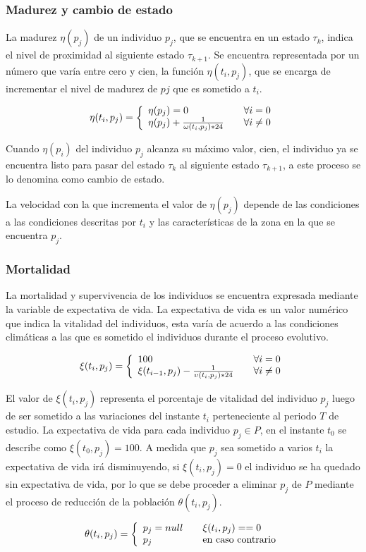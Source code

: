 \subsubsection{Madurez y cambio de estado}
La madurez $\eta (p_{j})$ de un individuo $p_{j}$, que se encuentra en un estado $\tau_{k}$, indica el nivel de
proximidad al siguiente estado $\tau_{k+1}$. Se encuentra representada por un número que varía entre
cero y cien, la función $\eta (t_{i}, p_{j})$, que se encarga de incrementar el nivel de madurez de $p{j}$
que es sometido a $t_{i}$.

\begin{equation}
\eta (t_{i}, p_{j}) = \left\{
  \begin{array}{l l}
    \eta (p_{j}) = 0 & \quad \forall i = 0 \\
    \eta (p_{j}) + \frac{1}{\omega(t_{i}, p_{j}) * 24} & \quad \forall i \neq 0
  \end{array} \right.
\end{equation}

Cuando $\eta(p_{i})$ del individuo $p_{j}$ alcanza su máximo valor, cien, el individuo ya se encuentra listo para
pasar del estado $\tau_{k}$ al siguiente estado $\tau_{k+1}$, a este proceso se lo denomina como cambio de estado.

La velocidad con la que incrementa el valor de $\eta(p_{j})$ depende de las condiciones a las condiciones
descritas  por $t_{i}$ y las características de la zona en la que se encuentra $p_{j}$.

\subsubsection{Mortalidad}
La mortalidad y supervivencia de los individuos se encuentra expresada mediante la variable de expectativa de
vida. La expectativa de vida es un valor numérico que indica la vitalidad del individuos, esta varía de acuerdo
a las condiciones climáticas a las que es sometido el individuos durante el proceso evolutivo.

\begin{equation}
\xi (t_{i}, p_{j}) = \left\{
  \begin{array}{l l}
    100 & \quad \forall i = 0 \\
    \xi (t_{i-1}, p_{j}) - \frac{1}{\upsilon(t_{i}, p_{j}) * 24} & \quad \forall i \neq 0
  \end{array} \right.
\end{equation}

El valor de $\xi (t_{i}, p_{j})$ representa el porcentaje de vitalidad del
individuo $p_{j}$ luego de ser sometido a las variaciones del instante
$t_{i}$ perteneciente al periodo $T$ de estudio. La expectativa de vida
para cada individuo $p_{j} \in P$, en el instante $t_{0}$ se describe como
$\xi (t_{0}, p_{j})= 100$. A medida que $p_{j}$ sea sometido a varios
$t_{i}$ la expectativa de vida irá disminuyendo, si $\xi (t_{i}, p_{j})= 0$ el
individuo se ha quedado sin expectativa de vida, por lo que se debe proceder
a eliminar $p_{j}$ de $P$ mediante el proceso de reducción de la población
$\theta (t_{i}, p_{j})$.

\begin{equation}
\theta (t_{i}, p_{j}) = \left\{
  \begin{array}{l l}
    p_{j} = null & \quad \xi(t_{i}, p_{j}) == 0 \\
    p_{j} & \quad \text{en caso contrario}
  \end{array} \right.
\end{equation}
